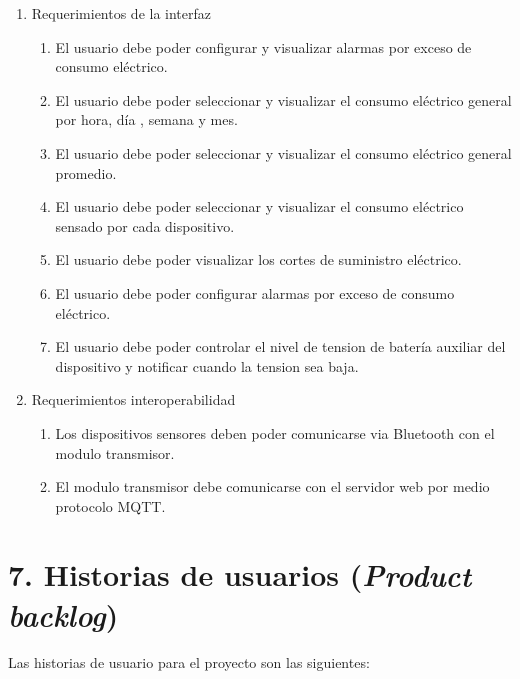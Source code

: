 \documentclass[
11pt, %
]{charter}
\begin{document}
\begin{enumerate}
\begin{enumerate}
		\end{enumerate}
	\item Requerimientos de la interfaz
		\begin{enumerate}
			\item El usuario debe poder configurar y visualizar alarmas por exceso de consumo eléctrico.
			\item El usuario debe poder seleccionar y visualizar el consumo eléctrico general por hora, día , semana y mes.
			\item El usuario debe poder seleccionar y visualizar el consumo eléctrico general promedio.
			\item El usuario debe poder seleccionar y visualizar el consumo eléctrico sensado por cada dispositivo.
			\item El usuario debe poder visualizar los cortes de suministro eléctrico.
			\item El usuario debe poder configurar alarmas por exceso de consumo eléctrico.	
			\item El usuario debe poder controlar el nivel de tension de batería auxiliar del dispositivo y notificar cuando la tension sea baja. 
		\end{enumerate}
	
	\item Requerimientos interoperabilidad
	\begin{enumerate}
		\item Los dispositivos sensores deben poder comunicarse via Bluetooth con el modulo transmisor.
		\item El modulo transmisor debe comunicarse con el servidor web por medio protocolo MQTT.
	\end{enumerate}
	
\end{enumerate}



\section{7. Historias de usuarios (\textit{Product backlog})}
\label{sec:backlog}

Las historias de usuario para el proyecto son las siguientes:
\end{document}
